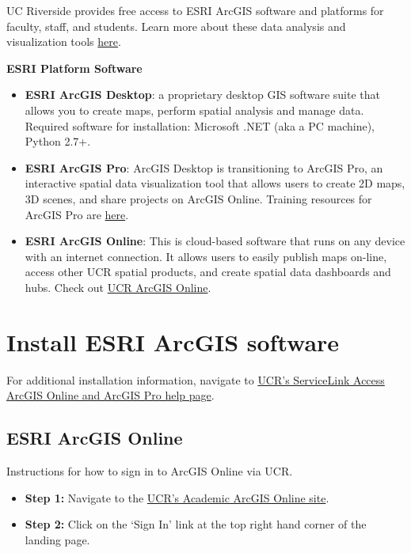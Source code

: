 \documentclass[
]{book}
\providecommand{\tightlist}{%
  \setlength{\itemsep}{0pt}\setlength{\parskip}{0pt}}
\begin{document}
UC Riverside provides free access to ESRI ArcGIS software and platforms for faculty, staff, and students. Learn more about these data analysis and visualization tools \href{https://ucrsupport.service-now.com/ucr_portal?id=sc_category\&sys_id=e9b36a7e1b691c10eab58734ec4bcb78\&catalog_id=-1}{here}.

\textbf{ESRI Platform Software}

\begin{itemize}
\tightlist
\item
  \textbf{ESRI ArcGIS Desktop}: a proprietary desktop GIS software suite that allows you to create maps, perform spatial analysis and manage data. Required software for installation: Microsoft .NET (aka a PC machine), Python 2.7+.
\item
  \textbf{ESRI ArcGIS Pro}: ArcGIS Desktop is transitioning to ArcGIS Pro, an interactive spatial data visualization tool that allows users to create 2D maps, 3D scenes, and share projects on ArcGIS Online. Training resources for ArcGIS Pro are \href{https://www.esri.com/en-us/arcgis/products/arcgis-pro/resources}{here}.
\item
  \textbf{ESRI ArcGIS Online}: This is cloud-based software that runs on any device with an internet connection. It allows users to easily publish maps on-line, access other UCR spatial products, and create spatial data dashboards and hubs. Check out \href{https://ucr.maps.arcgis.com/home/index.html}{UCR ArcGIS Online}.
\end{itemize}

\hypertarget{install-esri-arcgis-software}{%
\section{Install ESRI ArcGIS software}\label{install-esri-arcgis-software}}

For additional installation information, navigate to \href{https://ucrsupport.service-now.com/ucr_portal?id=kb_article\&sys_id=0231b6e21b095190453e7592cd4bcbaf}{UCR's ServiceLink Access ArcGIS Online and ArcGIS Pro help page}.

\hypertarget{esri-arcgis-online}{%
\subsection{ESRI ArcGIS Online}\label{esri-arcgis-online}}

Instructions for how to sign in to ArcGIS Online via UCR.

\begin{itemize}
\item
  \textbf{Step 1:} Navigate to the \href{https://ucr.maps.arcgis.com/home/index.html}{UCR's Academic ArcGIS Online site}.
\item
  \textbf{Step 2:} Click on the `Sign In' link at the top right hand corner of the landing page.
\end{itemize}
\end{document}
